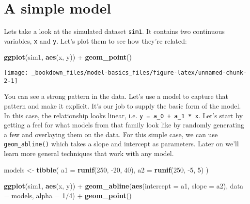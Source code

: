 \documentclass[]{book}
\newenvironment{Shaded}{\begin{snugshade}}{\end{snugshade}}
\newcommand{\KeywordTok}[1]{\textcolor[rgb]{0.13,0.29,0.53}{\textbf{{#1}}}}
\newcommand{\DataTypeTok}[1]{\textcolor[rgb]{0.13,0.29,0.53}{{#1}}}
\newcommand{\DecValTok}[1]{\textcolor[rgb]{0.00,0.00,0.81}{{#1}}}
\newcommand{\StringTok}[1]{\textcolor[rgb]{0.31,0.60,0.02}{{#1}}}
\newcommand{\NormalTok}[1]{{#1}}
\begin{document}
\section{A simple model}\label{a-simple-model}

Lets take a look at the simulated dataset \texttt{sim1}. It contains two
continuous variables, \texttt{x} and \texttt{y}. Let's plot them to see
how they're related:

\begin{Shaded}
\begin{Highlighting}[]
\KeywordTok{ggplot}\NormalTok{(sim1, }\KeywordTok{aes}\NormalTok{(x, y)) +}\StringTok{ }
\StringTok{  }\KeywordTok{geom_point}\NormalTok{()}
\end{Highlighting}
\end{Shaded}

\begin{center}\texttt{[image: \_bookdown\_files/model-basics\_files/figure-latex/unnamed-chunk-2-1]} \end{center}

You can see a strong pattern in the data. Let's use a model to capture
that pattern and make it explicit. It's our job to supply the basic form
of the model. In this case, the relationship looks linear, i.e.
\texttt{y\ =\ a\_0\ +\ a\_1\ *\ x}. Let's start by getting a feel for
what models from that family look like by randomly generating a few and
overlaying them on the data. For this simple case, we can use
\texttt{geom\_abline()} which takes a slope and intercept as parameters.
Later on we'll learn more general techniques that work with any model.

\begin{Shaded}
\begin{Highlighting}[]
\NormalTok{models <-}\StringTok{ }\KeywordTok{tibble}\NormalTok{(}
  \DataTypeTok{a1 =} \KeywordTok{runif}\NormalTok{(}\DecValTok{250}\NormalTok{, -}\DecValTok{20}\NormalTok{, }\DecValTok{40}\NormalTok{),}
  \DataTypeTok{a2 =} \KeywordTok{runif}\NormalTok{(}\DecValTok{250}\NormalTok{, -}\DecValTok{5}\NormalTok{, }\DecValTok{5}\NormalTok{)}
\NormalTok{)}

\KeywordTok{ggplot}\NormalTok{(sim1, }\KeywordTok{aes}\NormalTok{(x, y)) +}\StringTok{ }
\StringTok{  }\KeywordTok{geom_abline}\NormalTok{(}\KeywordTok{aes}\NormalTok{(}\DataTypeTok{intercept =} \NormalTok{a1, }\DataTypeTok{slope =} \NormalTok{a2), }\DataTypeTok{data =} \NormalTok{models, }\DataTypeTok{alpha =} \DecValTok{1}\NormalTok{/}\DecValTok{4}\NormalTok{) +}
\StringTok{  }\KeywordTok{geom_point}\NormalTok{() }
\end{Highlighting}
\end{Shaded}
\end{document}
